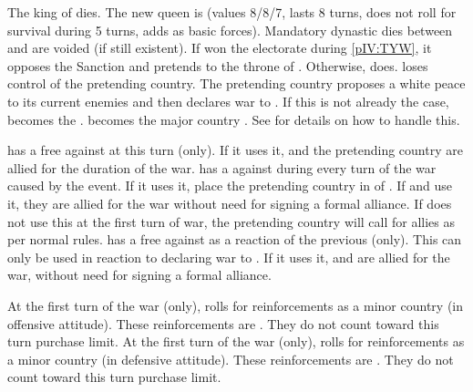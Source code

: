 \phevnt
{}
\bparag The king of \AUS dies. The new queen is 
(values 8/8/7, lasts 8 turns, does not roll for survival during 5 turns, adds
\ARMY\faceplus as basic forces).
\bparag Mandatory dynastic dies between \HIS and \AUS are voided (if still
existent).
\bparag If \paysbaviere won the electorate during \ref{pIV:TYW}, it opposes
the Sanction and pretends to the throne of \AUS. Otherwise, \payspalatinat
does.
\aparag \AUS loses control of the pretending country.
\aparag The pretending country proposes a white peace to its current enemies
and then declares war to \AUS.
\aparag If this is not already the case, \POL becomes the \POLmin. \PRUMin
becomes the major country \PRU.
\bparag See  for details on how
to handle this.



\phdipl
\aparag \PRU has a free \CB against \AUS at this turn (only).
\bparag If it uses it, \PRU and the pretending country are allied for the
duration of the war.
\aparag \FRA has a \CB against \AUS during every turn of the war caused by the
event.
\bparag If it uses it, place the pretending country in \EG of \FRA.
\bparag If \PRU and \FRA use it, they are allied for the war without need for
signing a formal alliance.
\bparag If \FRA does not use this \CB at the first turn of war, the pretending
country will call for allies as per normal rules.
\aparag \ANG has a free \CB against \FRA as a reaction of the previous \CB
(only).
\bparag This \CB can only be used in reaction to \FRA declaring war to \AUS.
\bparag If it uses it, \ANG and \AUS are allied for the war, without need for
signing a formal alliance.

\phadm
\aparag At the first turn of the war (only), \PRU rolls for reinforcements as
a minor country (in offensive attitude).
\bparag These reinforcements are \Veteran. They do not count toward this turn
purchase limit.
\aparag At the first turn of the war (only), \AUS rolls for reinforcements as
a minor country (in defensive attitude).
\bparag These reinforcements are \Conscripts. They do not count toward this
turn purchase limit.

